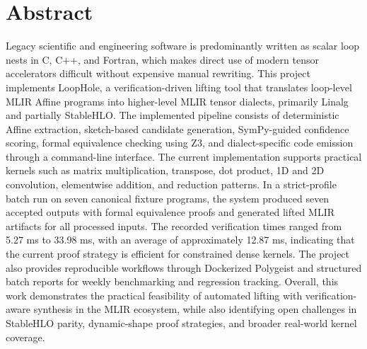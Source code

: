 \chapter*{Abstract}%
%

Legacy scientific and engineering software is predominantly written as scalar loop nests in C, C++, and Fortran, which makes direct use of modern tensor accelerators difficult without expensive manual rewriting. This project implements LoopHole, a verification-driven lifting tool that translates loop-level MLIR Affine programs into higher-level MLIR tensor dialects, primarily Linalg and partially StableHLO. The implemented pipeline consists of deterministic Affine extraction, sketch-based candidate generation, SymPy-guided confidence scoring, formal equivalence checking using Z3, and dialect-specific code emission through a command-line interface. The current implementation supports practical kernels such as matrix multiplication, transpose, dot product, 1D and 2D convolution, elementwise addition, and reduction patterns. In a strict-profile batch run on seven canonical fixture programs, the system produced seven accepted outputs with formal equivalence proofs and generated lifted MLIR artifacts for all processed inputs. The recorded verification times ranged from 5.27 ms to 33.98 ms, with an average of approximately 12.87 ms, indicating that the current proof strategy is efficient for constrained dense kernels. The project also provides reproducible workflows through Dockerized Polygeist and structured batch reports for weekly benchmarking and regression tracking. Overall, this work demonstrates the practical feasibility of automated lifting with verification-aware synthesis in the MLIR ecosystem, while also identifying open challenges in StableHLO parity, dynamic-shape proof strategies, and broader real-world kernel coverage.
\thispagestyle{plain}
